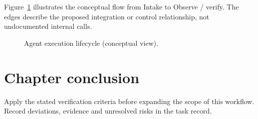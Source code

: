 Figure~\ref{fig:d5} illustrates the conceptual flow from Intake to Observe / verify. The edges describe the proposed integration or control relationship, not undocumented internal calls.

\begin{figure}[htbp]\centering\caption{Agent execution lifecycle (conceptual view).}\label{fig:d5}\end{figure}

\section{Chapter conclusion}

Apply the stated verification criteria before expanding the scope of this workflow. Record deviations, evidence and unresolved risks in the task record.
